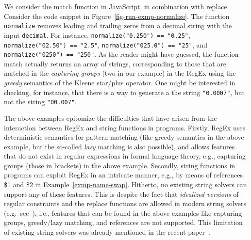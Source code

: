 \begin{example}\label{ex:normalize}
    We consider the match function in JavaScript,
    in combination with replace. %
    Consider the code snippet in Figure~\ref{fig-run-exmp-normalize}.
 The function {\tt normalize}   removes leading and trailing zeros from a decimal string with the input %
{\tt decimal}. For instance, 
 \texttt{normalize("0.250") == "0.25"},
 \texttt{normalize("02.50") == "2.5"},
 \texttt{normalize("025.0") == "25"},
and  \texttt{normalize("0250") == "250"}. As the reader might have
    guessed, the function match actually returns an array of strings,
    corresponding to those that are matched in the \emph{capturing groups} (two 
    in our example) in the RegEx using the \emph{greedy} semantics of the Kleene star/plus operator. One might be
    interested in checking, for instance, that there is a way to generate a
    the string \texttt{"0.0007"}, but not the string \texttt{"00.007"}.
\end{example}



The above examples epitomize the difficulties that have arisen from the
interaction between RegEx and string functions in programs. Firstly,
RegEx uses deterministic semantics for pattern matching (like greedy
semantics in the above example, but the so-called \emph{lazy} matching is
also possible), and allows features that do not exist in regular expressions in
formal language theory, e.g., capturing groups (those in brackets) in the above
example. Secondly, string functions in programs can exploit RegEx in an
intricate manner, e.g., by means of references \$1 and \$2 in Example~\ref{exmp-name-swap}. Hitherto, no existing string solvers
can support any of these features. This is despite the fact that \emph{idealized
versions} of regular 
constraints and the replace functions are allowed in modern string solvers
(e.g.\ see~\cite{AbdullaACDHRR18-trau,HJLRV18,cvc4,TCJ16,YABI14,CHL+19}), i.e., 
features that can be found in the above examples like capturing groups, 
greedy/lazy matching, and references are not supported.
This limitation of existing
string solvers was already mentioned in the recent paper~\cite{LMK19}.

